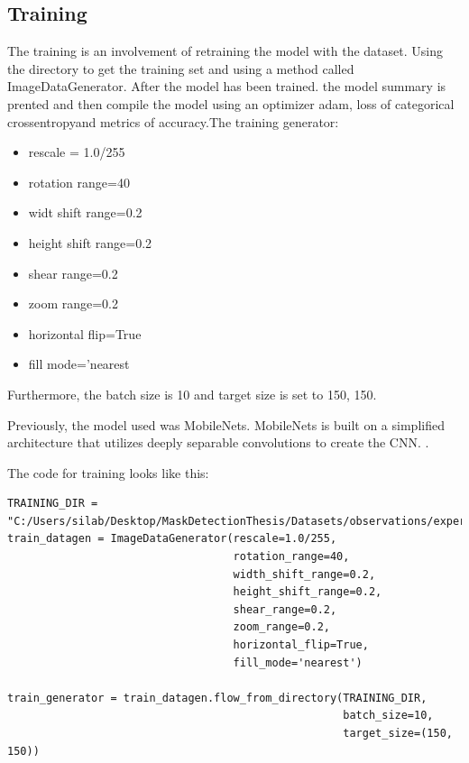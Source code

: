 \subsection{Training}
The training is an involvement of retraining the model with the dataset. Using the directory to get the training set and using a method called ImageDataGenerator.
After the model has been trained. the model summary is prented and then compile the model using an optimizer adam, loss of categorical crossentropyand metrics of accuracy.The training generator:
\begin{itemize}
    \item rescale = 1.0/255
    \item rotation range=40
    \item widt shift range=0.2
    \item height shift range=0.2
    \item shear range=0.2
    \item zoom range=0.2
    \item horizontal flip=True
    \item fill mode='nearest
\end{itemize}

Furthermore, the batch size is 10 and target size is set to 150, 150.

Previously, the model used was MobileNets. MobileNets is built on a simplified architecture that utilizes deeply separable convolutions to create the CNN. \cite{alsing2018mobile}.

The code for training looks like this:
\begin{lstlisting}
TRAINING_DIR = "C:/Users/silab/Desktop/MaskDetectionThesis/Datasets/observations/experiements/dest_folder/train"
train_datagen = ImageDataGenerator(rescale=1.0/255,
                                   rotation_range=40,
                                   width_shift_range=0.2,
                                   height_shift_range=0.2,
                                   shear_range=0.2,
                                   zoom_range=0.2,
                                   horizontal_flip=True,
                                   fill_mode='nearest')

train_generator = train_datagen.flow_from_directory(TRAINING_DIR,
                                                    batch_size=10,
                                                    target_size=(150, 150))
\end{lstlisting}    
\vspace{4mm}

